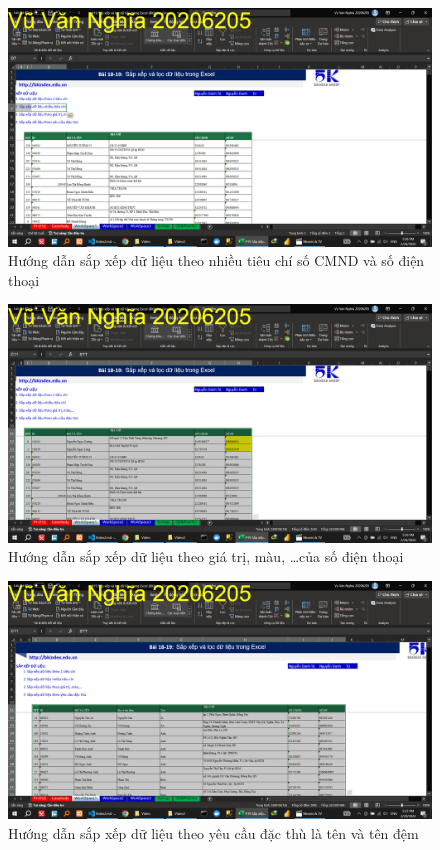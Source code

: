 \documentclass{article}
\begin{document}
\begin{figure}[h]
\centering
\includegraphics[scale = 0.15]{Video2/HuongDan/1.png}
\caption{Hướng dẫn sắp xếp dữ liệu theo nhiều tiêu chí số CMND và số điện thoại}
\end{figure}

\begin{figure}[h]
\centering
\includegraphics[scale = 0.15]{Video2/HuongDan/2.png}
\caption{Hướng dẫn sắp xếp dữ liệu theo giá trị, màu, \dots của số điện thoại}
\end{figure}

\begin{figure}[h]
\centering
\includegraphics[scale = 0.15]{Video2/HuongDan/3.png}
\caption{Hướng dẫn sắp xếp dữ liệu theo yêu cầu đặc thù là tên và tên đệm}
\end{figure}
\end{document}
